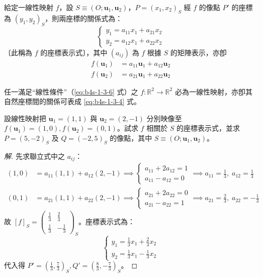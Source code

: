 \begin{proposition}[命題 2]
給定一線性映射 $f$，設 $S \equiv (O; \mathbf{u}_1, \mathbf{u}_2)$，$P = (x_1, x_2)_S$ 經 $f$ 的像點 $P'$ 的座標為 $(y_1, y_2)_S$，則兩座標的關係式為：
\begin{equation}
\begin{cases}
y_1 = a_{11}x_1 + a_{21}x_2 \\
y_2 = a_{12}x_1 + a_{22}x_2
\end{cases} \label{eq:b4s-1-3-11}
\end{equation}
〔此稱為 $f$ 的座標表示式〕，其中 $(a_{ij})$ 為 $f$ 根據 $S$ 的矩陣表示，亦卽
\begin{align*}
f(\mathbf{u}_1) &= a_{11}\mathbf{u}_1 + a_{12}\mathbf{u}_2 \\
f(\mathbf{u}_2) &= a_{21}\mathbf{u}_1 + a_{22}\mathbf{u}_2
\end{align*}
\end{proposition}

\begin{theorem}[定理 4]
任一滿足“線性條件”（\eqref{eq:b4s-1-3-6} 式）之 $f: \mathbb{R}^2 \to \mathbb{R}^2$ 必為一線性映射，亦卽其自然座標間的關係可表成 \eqref{eq:b4s-1-3-4} 式。
\end{theorem}

\begin{example}[例 6]
設線性映射把 $\mathbf{u}_1 = (1, 1)$ 與 $\mathbf{u}_2 = (2, -1)$ 分別映像至 $f(\mathbf{u}_1) = (1, 0), f(\mathbf{u}_2) = (0, 1)$。試求 $f$ 相關於 $S$ 的座標表示式，並求 $P = (5, -2)_S$ 及 $Q = (-2, 5)_S$ 的像點，其中 $S \equiv (O; \mathbf{u}_1, \mathbf{u}_2)$。
\end{example}

\begin{proof}[解]
先求聯立式中之 $a_{ij}$：
\begin{align*}
(1, 0) &= a_{11}(1, 1) + a_{12}(2, -1) \implies \begin{cases} a_{11} + 2a_{12} = 1 \\ a_{11} - a_{12} = 0 \end{cases} \implies a_{11} = \frac{1}{3}, \; a_{12} = \frac{1}{3} \\
(0, 1) &= a_{21}(1, 1) + a_{22}(2, -1) \implies \begin{cases} a_{21} + 2a_{22} = 0 \\ a_{21} - a_{22} = 1 \end{cases} \implies a_{21} = \frac{2}{3}, \; a_{22} = -\frac{1}{3}
\end{align*}
故 $[f]_S = \begin{pmatrix} \frac{1}{3} & \frac{2}{3} \\ \frac{1}{3} & -\frac{1}{3} \end{pmatrix}_S$。座標表示式為：
\[ \begin{cases} y_1 = \frac{1}{3}x_1 + \frac{2}{3}x_2 \\ y_2 = \frac{1}{3}x_1 - \frac{1}{3}x_2 \end{cases} \]
代入得 $P' = (\frac{1}{3}, \frac{7}{3})_S, Q' = (\frac{8}{3}, -\frac{7}{3})_S$。
\end{proof}

